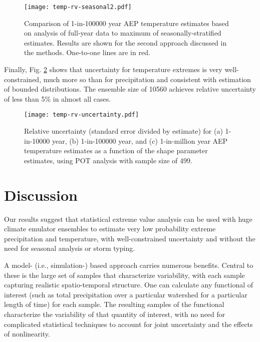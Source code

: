 \documentclass{ametsocV6.1}
\begin{document}
\begin{figure}
    \centering
    \texttt{[image: temp-rv-seasonal2.pdf]}
    \caption{Comparison of 1-in-100000 year AEP temperature estimates based on analysis of full-year data to maximum of seasonally-stratified estimates. Results are shown for the second approach discussed in the methods. One-to-one lines are in red.}
    \label{fig:temp-rv-seasonal2}
\end{figure}


Finally, Fig. \ref{fig:temp-rv-uncertainty} shows that uncertainty for temperature extremes is very well-constrained, much more so than for precipitation and consistent with estimation of bounded distributions. The ensemble size of 10560 achieves relative uncertainty of less than 5\% in almost all cases.

\begin{figure}
    \centering
    \texttt{[image: temp-rv-uncertainty.pdf]}
    \caption{Relative uncertainty (standard error divided by estimate) for (a) 1-in-10000 year, (b) 1-in-100000 year, and (c) 1-in-million year AEP temperature estimates as a function of the shape parameter estimates, using POT analysis with sample size of 499.}
    \label{fig:temp-rv-uncertainty}
\end{figure}



\section{Discussion}

Our results suggest that statistical extreme value analysis can be used with huge climate emulator ensembles to estimate very low probability extreme precipitation and temperature, with well-constrained uncertainty and without the need for seasonal analysis or storm typing.

A model- (i.e., simulation-) based approach carries numerous benefits. Central to these is the large set of samples that characterize variability, with each sample capturing realistic spatio-temporal structure. One can calculate any functional of interest (such as total precipitation over a particular watershed for a particular length of time) for each sample. The resulting samples of the functional characterize the variability of that quantity of interest, with no need for complicated statistical techniques to account for joint uncertainty and the effects of nonlinearity. 
\end{document}
